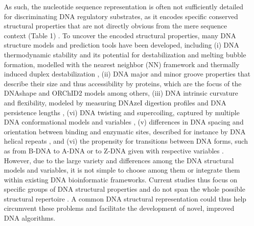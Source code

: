 \documentclass[10pt]{article}
\begin{document}
As such, the nucleotide sequence representation is often not sufficiently detailed for discriminating DNA regulatory substrates, as it encodes specific conserved structural properties that are not directly obvious from the mere sequence context (Table 1) \cite{Zrimec2018-lx,Tosato2017-nq,Slattery2014-ne}. To uncover the encoded structural properties, many DNA structure models and prediction tools have been developed, including (i) DNA thermodynamic stability and its potential for destabilization and melting bubble formation, modelled with the nearest neighbor (NN) framework \cite{SantaLucia1998-hc} and thermally induced duplex destabilization \cite{Zrimec2015-xf}, (ii) DNA major and minor groove properties that describe their size and thus accessibility by proteins, which are the focus of the DNAshape and ORChID2 models \cite{Bishop2011-jm,Chiu2016-kb} among others, (iii) DNA intrinsic curvature and flexibility, modeled by measuring DNAzeI digestion profiles \cite{Brukner1995-pt} and DNA persistence lengths \cite{Geggier2010-mw}, (vi) DNA twisting and supercoiling, captured by multiple DNA conformational models and variables \cite{Karas1996-qz,Olson1998-rw,Perez2004-sx}, (v) differences in DNA spacing and orientation between binding and enzymatic sites, described for instance by DNA helical repeats \cite{Geggier2010-mw}, and (vi) the propensity for transitions between DNA forms, such as from B-DNA to A-DNA or to Z-DNA given with respective variables \cite{Aida1988-iq,Hartmann1989-ji,Kulkarni2013-xm,Ho1986-hg}. However, due to the large variety and differences among the DNA structural models and variables, it is not simple to choose among them or integrate them within existing DNA bioinformatic frameworks. Current studies thus focus on specific groups of DNA structural properties and do not span the whole possible structural repertoire \cite{Chiu2016-kb,Zrimec2018-lx,Zrimec2013-ds,Samee2019-xj,Bansal2014-ko,Chen2012-gd}. A common DNA structural representation could thus help circumvent these problems and facilitate the development of novel, improved DNA algorithms. 
\end{document}
